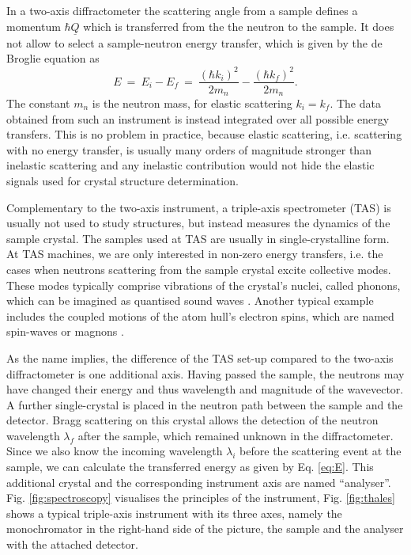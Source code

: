 In a two-axis diffractometer the scattering angle from a sample defines a momentum $\hbar \underline{Q}$ which is transferred from the the neutron to the sample. It does not allow to select a sample-neutron energy transfer, which is given by the de Broglie equation as \cite[p. 89]{Gross2012} \cite[p. 11]{Shirane2002}
\begin{equation}
	\label{eq:E}
	E \ =\ E_i - E_f \ =\ \frac{\left( \hbar k_i \right)^2}{2 m_n} - \frac{\left( \hbar k_f \right)^2}{2 m_n}.
\end{equation}
The constant $m_n$ is the neutron mass, for elastic scattering $k_i = k_f$.
The data obtained from such an instrument is instead integrated over all possible energy transfers. This is no problem in practice, because elastic scattering, i.e. scattering with no energy transfer, is usually many orders of magnitude stronger than inelastic scattering and any inelastic contribution would not hide the elastic signals used for crystal structure determination.

Complementary to the two-axis instrument, a triple-axis spectrometer (TAS) is usually not used to study structures, but instead measures the dynamics of the sample crystal. The samples used at TAS are usually in single-crystalline form. At TAS machines, we are only interested in non-zero energy transfers, i.e. the cases when neutrons scattering from the sample crystal excite collective modes. These modes typically comprise vibrations of the crystal's nuclei, called phonons, which can be imagined as quantised sound waves \cite[pp. 123-137]{Shirane2002}. Another typical example includes the coupled motions of the atom hull's electron spins, which are named spin-waves or magnons \cite[pp. 137-144]{Shirane2002}.

As the name implies, the difference of the TAS set-up compared to the two-axis diffractometer is one additional axis. Having passed the sample, the neutrons may have changed their energy and thus wavelength and magnitude of the wavevector. A further single-crystal is placed in the neutron path between the sample and the detector. Bragg scattering on this crystal allows the detection of the neutron wavelength $\lambda_f$ after the sample, which remained unknown in the diffractometer. Since we also know the incoming wavelength $\lambda_i$ before the scattering event at the sample, we can calculate the transferred energy as given by Eq. \ref{eq:E}. This additional crystal and the corresponding instrument axis are named ``analyser''. Fig. \ref{fig:spectroscopy} visualises the principles of the instrument, Fig. \ref{fig:thales} shows a typical triple-axis instrument with its three axes, namely the monochromator in the right-hand side of the picture, the sample and the analyser with the attached detector.

